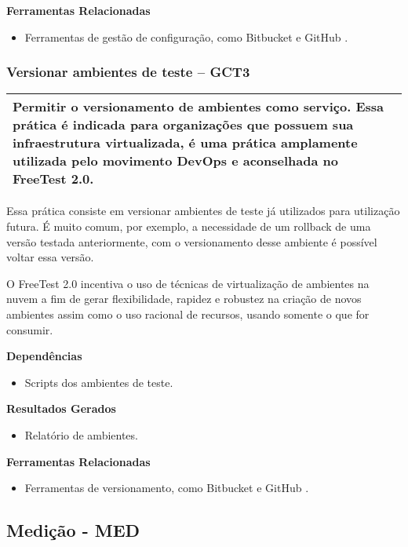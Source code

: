 \textbf{Ferramentas Relacionadas}
\begin{itemize}
    \item Ferramentas de gestão de configuração, como Bitbucket \cite{Bitbucket} e GitHub \cite{GitHub}.
\end{itemize}

\subsubsection{Versionar ambientes de teste – GCT3 }
\label{sec:gct3}

\begin{table}[!ht]
\centering
\begin{tabular}{|p{130mm}|}
\hline
Permitir o versionamento de ambientes como serviço. Essa prática é indicada para organizações que possuem sua infraestrutura virtualizada, é uma prática amplamente utilizada pelo movimento DevOps e aconselhada no FreeTest 2.0. \\ 
\hline
\end{tabular}
\end{table}

Essa prática consiste em versionar ambientes de teste já utilizados para utilização futura. É muito comum, por exemplo, a necessidade de um rollback de uma versão testada anteriormente, com o versionamento desse ambiente é possível voltar essa versão.

O FreeTest 2.0 incentiva o uso de técnicas de virtualização de ambientes na nuvem a fim de gerar flexibilidade, rapidez e robustez na criação de novos ambientes assim como o uso racional de recursos, usando somente o que for consumir.

\textbf{Dependências}
 \begin{itemize}
     \item Scripts dos ambientes de teste.
\end{itemize}

\textbf{Resultados Gerados }
\begin{itemize}
    \item Relatório de ambientes.
\end{itemize}

\textbf{Ferramentas Relacionadas }
\begin{itemize}
    \item Ferramentas de versionamento, como Bitbucket \cite{Bitbucket} e GitHub \cite{GitHub}.
\end{itemize}

\subsection{Medição - MED}
\label{sec:med}

